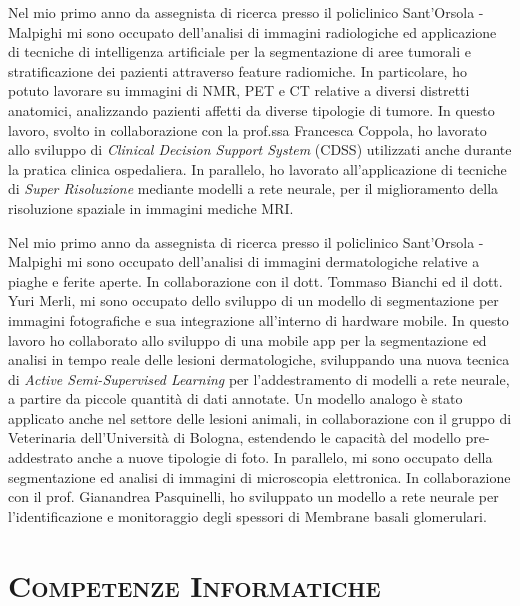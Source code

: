 \documentclass[a4paper,11pt]{article}
\begin{document}
Nel mio primo anno da assegnista di ricerca presso il policlinico Sant'Orsola - Malpighi mi sono occupato dell'analisi di immagini radiologiche ed applicazione di tecniche di intelligenza artificiale per la segmentazione di aree tumorali e stratificazione dei pazienti attraverso feature radiomiche.
In particolare, ho potuto lavorare su immagini di NMR, PET e CT relative a diversi distretti anatomici, analizzando pazienti affetti da diverse tipologie di tumore.
In questo lavoro, svolto in collaborazione con la prof.ssa Francesca Coppola, ho lavorato allo sviluppo di \emph{Clinical Decision Support System} (CDSS) utilizzati anche durante la pratica clinica ospedaliera.
In parallelo, ho lavorato all'applicazione di tecniche di \emph{Super Risoluzione} mediante modelli a rete neurale, per il miglioramento della risoluzione spaziale in immagini mediche MRI.

Nel mio primo anno da assegnista di ricerca presso il policlinico Sant'Orsola - Malpighi mi sono occupato dell'analisi di immagini dermatologiche relative a piaghe e ferite aperte.
In collaborazione con il dott. Tommaso Bianchi ed il dott. Yuri Merli, mi sono occupato dello sviluppo di un modello di segmentazione per immagini fotografiche e sua integrazione all'interno di hardware mobile.
In questo lavoro ho collaborato allo sviluppo di una mobile app per la segmentazione ed analisi in tempo reale delle lesioni dermatologiche, sviluppando una nuova tecnica di \emph{Active Semi-Supervised Learning} per l'addestramento di modelli a rete neurale, a partire da piccole quantità di dati annotate.
Un modello analogo è stato applicato anche nel settore delle lesioni animali, in collaborazione con il gruppo di Veterinaria dell'Università di Bologna, estendendo le capacità del modello pre-addestrato anche a nuove tipologie di foto.
In parallelo, mi sono occupato della segmentazione ed analisi di immagini di microscopia elettronica.
In collaborazione con il prof. Gianandrea Pasquinelli, ho sviluppato un modello a rete neurale per l'identificazione e monitoraggio degli spessori di Membrane basali glomerulari.


\vspace*{0.5cm}
\section*{\scshape{Competenze Informatiche}}
\end{document}
